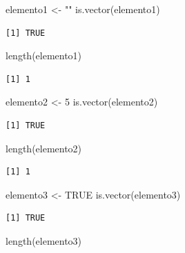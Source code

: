 \documentclass[
  letterpaper,
  DIV=11,
  numbers=noendperiod]{scrreprt}
\newenvironment{Shaded}{\begin{snugshade}}{\end{snugshade}}
\newcommand{\ConstantTok}[1]{\textcolor[rgb]{0.56,0.35,0.01}{#1}}
\newcommand{\DecValTok}[1]{\textcolor[rgb]{0.68,0.00,0.00}{#1}}
\newcommand{\FunctionTok}[1]{\textcolor[rgb]{0.28,0.35,0.67}{#1}}
\newcommand{\NormalTok}[1]{\textcolor[rgb]{0.00,0.23,0.31}{#1}}
\newcommand{\OtherTok}[1]{\textcolor[rgb]{0.00,0.23,0.31}{#1}}
\newcommand{\StringTok}[1]{\textcolor[rgb]{0.13,0.47,0.30}{#1}}
\begin{document}
\begin{Shaded}
\begin{Highlighting}[]
\NormalTok{elemento1 }\OtherTok{\textless{}{-}} \StringTok{""}
\FunctionTok{is.vector}\NormalTok{(elemento1)}
\end{Highlighting}
\end{Shaded}

\begin{verbatim}
[1] TRUE
\end{verbatim}

\begin{Shaded}
\begin{Highlighting}[]
\FunctionTok{length}\NormalTok{(elemento1)}
\end{Highlighting}
\end{Shaded}

\begin{verbatim}
[1] 1
\end{verbatim}

\begin{Shaded}
\begin{Highlighting}[]
\NormalTok{elemento2 }\OtherTok{\textless{}{-}} \DecValTok{5}
\FunctionTok{is.vector}\NormalTok{(elemento2)}
\end{Highlighting}
\end{Shaded}

\begin{verbatim}
[1] TRUE
\end{verbatim}

\begin{Shaded}
\begin{Highlighting}[]
\FunctionTok{length}\NormalTok{(elemento2)}
\end{Highlighting}
\end{Shaded}

\begin{verbatim}
[1] 1
\end{verbatim}

\begin{Shaded}
\begin{Highlighting}[]
\NormalTok{elemento3 }\OtherTok{\textless{}{-}} \ConstantTok{TRUE}
\FunctionTok{is.vector}\NormalTok{(elemento3)}
\end{Highlighting}
\end{Shaded}

\begin{verbatim}
[1] TRUE
\end{verbatim}

\begin{Shaded}
\begin{Highlighting}[]
\FunctionTok{length}\NormalTok{(elemento3)}
\end{Highlighting}
\end{Shaded}
\end{document}
